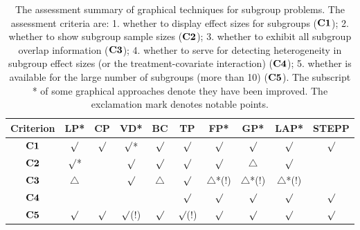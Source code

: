 \documentclass[Afour,sagev,times, doublespace]{sagej}
\begin{document}
{\begin{table*}
\small\sf\centering
\caption{The assessment summary of graphical techniques for subgroup problems. The assessment criteria are: 1. whether to display effect sizes for subgroups ($\bf C1$); 2. whether to show subgroup sample sizes ($\bf C2$); 3. whether to exhibit all subgroup overlap information ($\bf C3$); 4. whether to serve for detecting heterogeneity in subgroup effect sizes (or the treatment-covariate interaction) ($\bf C4$); 5. whether is available for the large number of subgroups (more than 10) ($\bf C5$). The subscript * of some graphical approaches denote they have been improved. The exclamation mark denotes notable points. }\label{T1}
\begin{tabular}{cccccccccc}
\toprule
Criterion& LP*         & CP          & VD*         & BC          &TP           & FP*            & GP*            & LAP*          & STEPP \\
\midrule
$\bf C1$ &$\surd$      & $\surd$     & $\surd$*    & $\surd$     & $\surd$     & $\surd$        & $\surd$        & $\surd$       & $\surd$     \\
$\bf C2$ &$\surd$*     &             & $\surd$     & $\surd$     & $\surd$     & $\surd$        & $\triangle$    & $\surd$       &             \\
$\bf C3$ &$\triangle$  &             & $\surd$     & $\triangle$ & $\surd$     & $\triangle$*(!)&$\triangle$*(!) &$\triangle$*(!)&             \\
$\bf C4$ &             &             &             &             & $\surd$     & $\surd$        & $\surd$        & $\surd$       & $\surd$     \\
$\bf C5$ &  $\surd$    & $\surd$     & $\surd$(!)  & $\surd$     & $\surd$(!)  & $\surd$        & $\surd$        & $\surd$       & $\surd$ \\
\bottomrule
\end{tabular}\\[10pt]
\end{table*}


}
\end{document}
